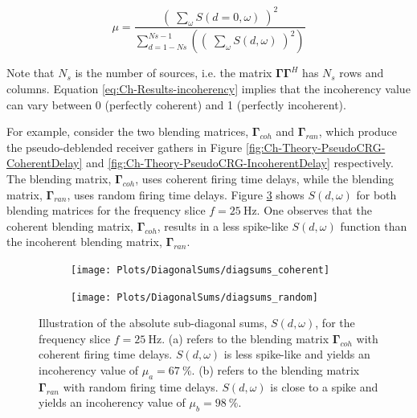 \begin{equation}
	\mu = \frac{\left( \; \sum_{\omega}S(d=0,\omega) \; \right)^2}{\sum_{d = 1-Ns}^{Ns-1} \left(\left( \; \sum_{\omega}S(d,\omega) \; \right)^2\right)}
	\label{eq:Ch-Results-incoherency}
\end{equation}

Note that $N_s$ is the number of sources, i.e. the matrix $\mathbf{\Gamma \Gamma}^H$ has $N_s$ rows and columns. Equation \ref{eq:Ch-Results-incoherency} implies that the incoherency value can vary between 0 (perfectly coherent) and 1 (perfectly incoherent).

For example, consider the two blending matrices, $\mathbf{\Gamma}_{coh}$ and $\mathbf{\Gamma}_{ran}$, which produce the pseudo-deblended receiver gathers in Figure \ref{fig:Ch-Theory-PseudoCRG-CoherentDelay} and \ref{fig:Ch-Theory-PseudoCRG-IncoherentDelay} respectively. The blending matrix, $\mathbf{\Gamma}_{coh}$, uses coherent firing time delays, while the blending matrix, $\mathbf{\Gamma}_{ran}$, uses random firing time delays. Figure \ref{fig:Ch-Incoherency-Coh-vs-Ran-Diag} shows $S(d,\omega)$ for both blending matrices for the frequency slice $f=\SI{25}{\hertz}$. One observes that the coherent blending matrix, $\mathbf{\Gamma}_{coh}$, results in a less spike-like $S(d,\omega)$ function than the incoherent blending matrix, $\mathbf{\Gamma}_{ran}$.

\begin{figure}
	
	\centering
	\begin{subfigure}[b]{0.45\textwidth}
	\centering
	\texttt{[image: Plots/DiagonalSums/diagsums\_coherent]}	
	\caption{}
	\label{fig:Ch-Incoherency-CoherentDiag}	
	\end{subfigure}
	\centering
	\begin{subfigure}[b]{0.45\textwidth}
	\centering
	\texttt{[image: Plots/DiagonalSums/diagsums\_random]}	
	\caption{}
	\label{fig:Ch-Incoherency-RandomDiag}	
	\end{subfigure}
	
	\caption{Illustration of the absolute sub-diagonal sums, $S(d,\omega)$, for the frequency slice $f=\SI{25}{\hertz}$. (a) refers to the blending matrix $\mathbf{\Gamma}_{coh}$ with coherent firing time delays.  $S(d,\omega)$ is less spike-like and yields an incoherency value of $\mu_a = \SI{67}{\percent}$. (b) refers to the blending matrix $\mathbf{\Gamma}_{ran}$ with random firing time delays. $S(d,\omega)$ is  close to a spike and yields an incoherency value of $\mu_b = \SI{98}{\percent}$.}
	\label{fig:Ch-Incoherency-Coh-vs-Ran-Diag}
	
\end{figure}


